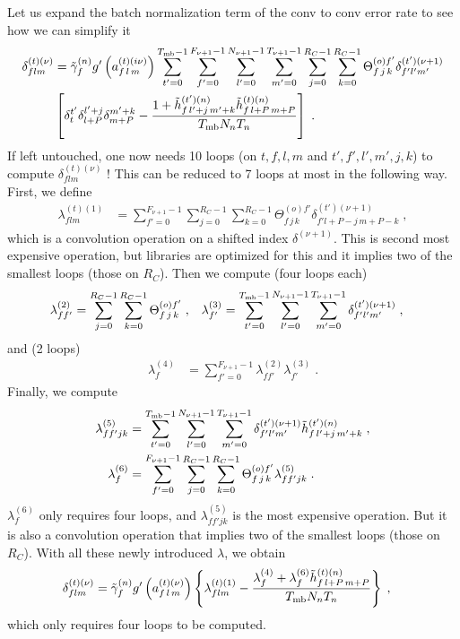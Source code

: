 \begin{subappendices}
Let us expand the batch normalization term of the conv to conv error rate to see how we can simplify it
\begin{align}
\delta^{(t)(\nu)}_{flm}&=\tilde{\gamma}^{(n)}_fg'\left(a_{f\,l\,m}^{(t)(i\nu)}\right)
%
\sum_{t'=0}^{T_{{\rm mb}}-1}\sum^{F_{\nu+1}-1}_{f'=0}\sum^{N_{\nu+1}-1}_{l'=0}\sum^{T_{\nu+1}-1}_{m'=0}
%
\sum^{R_C-1}_{j=0}\sum^{R_C-1}_{k=0}\Theta^{(o)f'}_{f\,j\,k}\delta_{f'l'm'}^{(t')(\nu+1)}\notag\\
%
&\left[\delta^{t'}_t\delta^{ l'+j}_{l+P}\delta^{m'+k}_{m+P}-
%
\frac{1+\tilde{h}_{f\, l'+j\,m'+k}^{(t')(n)}\tilde{h}_{f\,l+P\,m+P}^{(t)(n)}}{T_{{\rm mb}}N_nT_n}\right]\;.
\end{align}
If left untouched, one now needs 10 loops (on $t,f,l,m$ and $t',f',l',m',j,k$) to compute $\delta^{(t)(\nu)}_{flm}$ ! This can be reduced to 7 loops at most in the following way. First, we define
\begin{align}
\lambda^{(t)(1)}_{flm}&=\sum^{F_{\nu+1}-1}_{f'=0}\sum^{R_C-1}_{j=0}\sum^{R_C-1}_{k=0}
%
\Theta^{(o)f'}_{f\,j\,k}\delta_{f'l+P-j\,m+P-k}^{(t')(\nu+1)}\;,
\end{align}
which is a convolution operation on a shifted index $\delta^{(\nu+1)}$. This is second most expensive operation, but libraries are optimized for this and it implies two of the smallest loops (those on $R_C$). Then we compute (four loops each)
\begin{align}
\lambda^{(2)}_{ff'}&=\sum^{R_C-1}_{j=0}\sum^{R_C-1}_{k=0}\Theta^{(o)f'}_{f\,j\,k}\;,&
%
\lambda^{(3)}_{f'}&=\sum_{t'=0}^{T_{{\rm mb}}-1}\sum^{N_{\nu+1}-1}_{l'=0}\sum^{T_{\nu+1}-1}_{m'=0}
%
\delta_{f'l'm'}^{(t')(\nu+1)}\;,
\end{align}
and (2 loops)
\begin{align}
\lambda^{(4)}_{f}&=\sum^{F_{\nu+1}-1}_{f'=0}\lambda^{(2)}_{ff'}\lambda^{(3)}_{f'}\;.
\end{align}
Finally, we compute
\begin{align}
\lambda^{(5)}_{ff'jk}&=\sum_{t'=0}^{T_{{\rm mb}}-1}\sum^{N_{\nu+1}-1}_{l'=0}\sum^{T_{\nu+1}-1}_{m'=0}
%
\delta_{f'l'm'}^{(t')(\nu+1)}\tilde{h}_{f\, l'+j\,m'+k}^{(t')(n)}\;,\\
%
\lambda^{(6)}_{f}&=\sum^{F_{\nu+1}-1}_{f'=0}\sum^{R_C-1}_{j=0}\sum^{R_C-1}_{k=0}
%
\Theta^{(o)f'}_{f\,j\,k}\lambda^{(5)}_{ff'jk}\;.
\end{align}
$\lambda^{(6)}_{f}$ only requires four loops, and $\lambda^{(5)}_{ff'jk}$ is the most expensive operation. But it is also a convolution operation that implies two of the smallest loops (those on $R_C$). With all these newly introduced $\lambda$, we obtain
\begin{align}
\delta^{(t)(\nu)}_{flm}&=\tilde{\gamma}^{(n)}_fg'\left(a_{f\,l\,m}^{(t)(\nu)}\right)\left\{
%
\lambda^{(t)(1)}_{flm}-
%
\frac{\lambda^{(4)}_{f}+\lambda^{(6)}_{f}\tilde{h}_{f\,l+P\,m+P}^{(t)(n)}}{T_{{\rm mb}}N_nT_n}\right\}\;,
\end{align}
which only requires four loops to be computed.


\end{subappendices}
